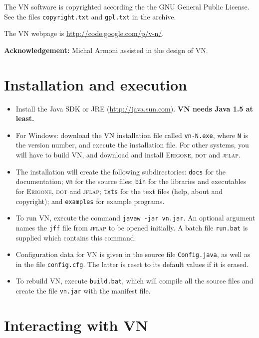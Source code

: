 \documentclass[11pt]{article}
\newcommand{\vn}{\textsc{VN}}
\newcommand{\jf}{\textsc{jflap}}
\newcommand{\dt}{\textsc{dot}}
\newcommand{\erg}{\textsc{Erigone}}
\newcommand{\p}[1]{\texttt{#1}}
\begin{document}
The \vn{} software is copyrighted according the the GNU General Public License.
See the files \p{copyright.txt} and \p{gpl.txt} in the archive.

The \vn{} webpage is \url{http://code.google.com/p/v-n/}.

\textbf{Acknowledgement:} Michal Armoni assisted in the design of \vn{}.

\section{Installation and execution}

\begin{itemize}
\item Install the Java SDK or JRE (\url{http://java.sun.com}).
\textbf{\vn{} needs Java 1.5 at least.}

\item For Windows: download the \vn{} installation file called \p{vn-N.exe},
where \p{N} is the version number, and execute the installation file.
For other systems, you will have to build \vn{}, and download and install
\erg{}, \dt{} and \jf{}.

\item The installation will create the following subdirectories: \p{docs} for the
documentation; \p{vn} for the source files; \p{bin} for the libraries and executables
for \erg{}, \dt{} and \jf{}; \p{txts} for the text files
(help, about and copyright); and \p{examples} for example programs.

\item To run \vn{}, execute the command \p{javaw -jar vn.jar}.
An optional argument names the \p{jff} file from \jf{} to be opened initially.
A batch file \p{run.bat} is supplied which contains this command.

\item Configuration data for \vn{} is given in the source file \p{Config.java}, 
as well as in the file \p{config.cfg}. The latter is reset to its default values
if it is erased.

\item To rebuild \vn{}, execute \p{build.bat}, which will compile all the source
files and create the file \p{vn.jar} with the manifest file.
\end{itemize}

\section{Interacting with \vn{}}
\end{document}
